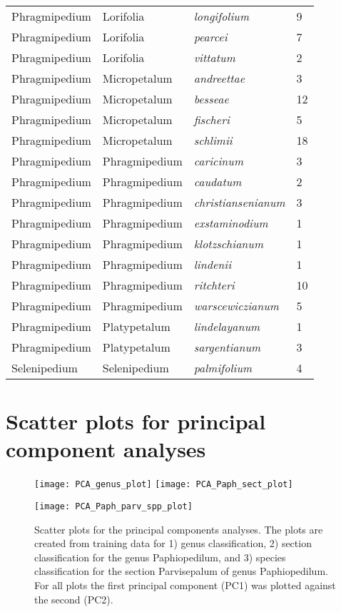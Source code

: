 \documentclass[review,3p,twocolumn]{elsarticle}
\begin{document}
\begin{footnotesize}
\begin{longtable}{llll}
    Phragmipedium & Lorifolia & \textit{longifolium} & 9 \\
    Phragmipedium & Lorifolia & \textit{pearcei} & 7 \\
    Phragmipedium & Lorifolia & \textit{vittatum} & 2 \\
    Phragmipedium & Micropetalum & \textit{andreettae} & 3 \\
    Phragmipedium & Micropetalum & \textit{besseae} & 12 \\
    Phragmipedium & Micropetalum & \textit{fischeri} & 5 \\
    Phragmipedium & Micropetalum & \textit{schlimii} & 18 \\
    Phragmipedium & Phragmipedium & \textit{caricinum} & 3 \\
    Phragmipedium & Phragmipedium & \textit{caudatum} & 2 \\
    Phragmipedium & Phragmipedium & \textit{christiansenianum} & 3 \\
    Phragmipedium & Phragmipedium & \textit{exstaminodium} & 1 \\
    Phragmipedium & Phragmipedium & \textit{klotzschianum} & 1 \\
    Phragmipedium & Phragmipedium & \textit{lindenii} & 1 \\
    Phragmipedium & Phragmipedium & \textit{ritchteri} & 10 \\
    Phragmipedium & Phragmipedium & \textit{warscewiczianum} & 5 \\
    Phragmipedium & Platypetalum & \textit{lindelayanum} & 1 \\
    Phragmipedium & Platypetalum & \textit{sargentianum} & 3 \\
    Selenipedium & Selenipedium & \textit{palmifolium} & 4 \\
\end{longtable}
\end{footnotesize}

\clearpage
\section{Scatter plots for principal component analyses}
\label{sect:pca-plots}

\begin{figure}[!h]
    \minipage{\textwidth}
        \texttt{[image: PCA\_genus\_plot]}
        \texttt{[image: PCA\_Paph\_sect\_plot]}
    \endminipage
    \par\vfill
    \minipage{\textwidth}
        \texttt{[image: PCA\_Paph\_parv\_spp\_plot]}
    \endminipage
    \caption{Scatter plots for the principal components analyses. The plots are created from training data for 1) genus classification, 2) section classification for the genus Paphiopedilum, and 3) species classification for the section Parvisepalum of genus Paphiopedilum. For all plots the first principal component (PC1) was plotted against the second (PC2).}
    \label{fig:pca-plots}
\end{figure}
\end{document}
